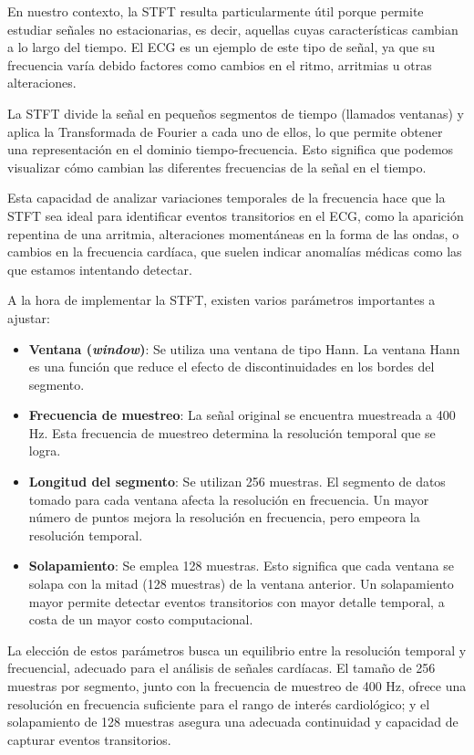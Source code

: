 En nuestro contexto, la STFT resulta particularmente útil porque permite estudiar señales no estacionarias, es decir, aquellas cuyas características cambian a lo largo del tiempo. El ECG es un ejemplo de este tipo de señal, ya que su frecuencia varía debido factores como cambios en el ritmo, arritmias u otras alteraciones.

La STFT divide la señal en pequeños segmentos de tiempo (llamados ventanas) y aplica la Transformada de Fourier a cada uno de ellos, lo que permite obtener una representación en el dominio tiempo-frecuencia. Esto significa que podemos visualizar cómo cambian las diferentes frecuencias de la señal en el tiempo.

Esta capacidad de analizar variaciones temporales de la frecuencia hace que la STFT sea ideal para identificar eventos transitorios en el ECG, como la aparición repentina de una arritmia, alteraciones momentáneas en la forma de las ondas, o cambios en la frecuencia cardíaca, que suelen indicar anomalías médicas como las que estamos intentando detectar.

A la hora de implementar la STFT, existen varios parámetros importantes a ajustar:

\begin{itemize}
	\item \textbf{Ventana (\emph{window})}: Se utiliza una ventana de tipo Hann. La ventana Hann es una función que reduce el efecto de discontinuidades en los bordes del segmento.
	
	\item \textbf{Frecuencia de muestreo}: La señal original se encuentra muestreada a 400 Hz. Esta frecuencia de muestreo determina la resolución temporal que se logra.
	
	\item \textbf{Longitud del segmento}: Se utilizan 256 muestras. El segmento de datos tomado para cada ventana afecta la resolución en frecuencia. Un mayor número de puntos mejora la resolución en frecuencia, pero empeora la resolución temporal.
	
	\item \textbf{Solapamiento}: Se emplea 128 muestras. Esto significa que cada ventana se solapa con la mitad (128 muestras) de la ventana anterior. Un solapamiento mayor permite detectar eventos transitorios con mayor detalle temporal, a costa de un mayor costo computacional.
	
\end{itemize}

La elección de estos parámetros busca un equilibrio entre la resolución temporal y frecuencial, adecuado para el análisis de señales cardíacas. El tamaño de 256 muestras por segmento, junto con la frecuencia de muestreo de 400 Hz, ofrece una resolución en frecuencia suficiente para el rango de interés cardiológico; y el solapamiento de 128 muestras asegura una adecuada continuidad y capacidad de capturar eventos transitorios.

